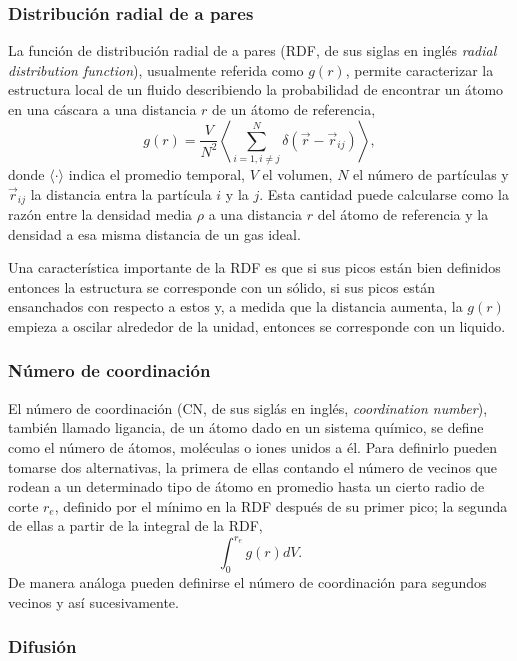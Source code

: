 \subsubsection{Distribución radial de a pares}

La función de distribución radial de a pares (RDF, de sus siglas en inglés
\textit{radial distribution function}), usualmente referida como $g(r)$, permite 
caracterizar la estructura local de un fluido describiendo la probabilidad de 
encontrar un átomo en una cáscara a una distancia $r$ de un átomo de referencia,
\begin{equation*}
g(r) = \frac{V}{N^2} \left\langle \sum_{i=1, i\neq j}^N \delta(\vec{r} - \vec{r}_{ij}) \right\rangle,
\end{equation*}
donde $\langle \cdot \rangle$ indica el promedio temporal, $V$ el volumen, $N$ el
número de partículas y $\vec{r}_{ij}$ la distancia entra la partícula $i$ y la $j$.
Esta cantidad puede calcularse como la razón entre la densidad media $\rho$ a
una distancia $r$ del átomo de referencia y la densidad a esa misma distancia de 
un gas ideal.

Una característica importante de la RDF es que si sus picos están bien definidos
entonces la estructura se corresponde con un sólido, si sus picos están ensanchados
con respecto a estos y, a medida que la distancia aumenta, la $g(r)$ empieza a 
oscilar alrededor de la unidad, entonces se corresponde con un liquido.

\subsubsection{Número de coordinación}

El número de coordinación (CN, de sus siglás en inglés, \textit{coordination 
number}), también llamado ligancia, de un átomo dado en un sistema químico, se 
define como el número de átomos, moléculas o iones unidos a él. Para definirlo 
pueden tomarse dos alternativas, la primera de ellas contando el número de 
vecinos que rodean a un determinado tipo de átomo en promedio hasta un cierto
radio de corte $r_e$, definido por el mínimo en la RDF después de su primer 
pico; la segunda de ellas a partir de la integral de la RDF,
\begin{equation*}
\int_0^{r_e} g(r) dV.
\end{equation*}
De manera análoga pueden definirse el número de coordinación para segundos 
vecinos y así sucesivamente.

\subsubsection{Difusión}

